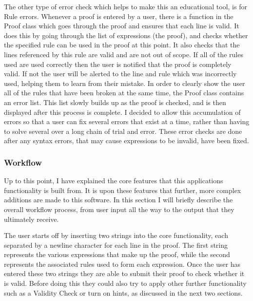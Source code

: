 The other type of error check which helps to make this an educational tool, is for Rule errors. Whenever a proof is entered by a user, there is a function in the Proof class which goes through the proof and ensures that each line is valid. It does this by going through the list of expressions (the proof), and checks whether the specified rule can be used in the proof at this point. It also checks that the lines referenced by this rule are valid and are not out of scope. If all of the rules used are used correctly then the user is notified that the proof is completely valid. If not the user will be alerted to the line and rule which was incorrectly used, helping them to learn from their mistake. In order to clearly show the user all of the rules that have been broken at the same time, the Proof class contains an error list. This list slowly builds up as the proof is checked, and is then displayed after this process is complete. I decided to allow this accumulation of errors so that a user can fix several errors that exist at a time, rather than having to solve several over a long chain of trial and error. These error checks are done after any syntax errors, that may cause expressions to be invalid, have been fixed.

\subsubsection{Workflow}
Up to this point, I have explained the core features that this applications functionality is built from. It is upon these features that further, more complex additions are made to this software. In this section I will briefly describe the overall workflow process, from user input all the way to the output that they ultimately receive.

The user starts off by inserting two strings into the core functionality, each separated by a newline character for each line in the proof. The first string represents the various expressions that make up the proof, while the second represents the associated rules used to form each expression. Once the user has entered these two strings they are able to submit their proof to check whether it is valid. Before doing this they could also try to apply other further functionality such as a Validity Check or turn on hints, as discussed in the next two sections.

